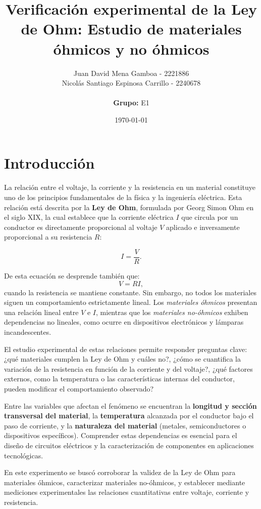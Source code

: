\documentclass[11pt,twocolumn]{article}
\title{\textbf{Verificación experimental de la Ley de Ohm: Estudio de materiales óhmicos y no óhmicos}}
\author{%
  Juan David Mena Gamboa - 2221886\\
  Nicolás Santiago Espinosa Carrillo - 2240678 \\
                      \\
  \textbf{Grupo:} E1
}
\date{\today}
\begin{document}
\maketitle
\thispagestyle{fancy}

\section{Introducción}

La relación entre el voltaje, la corriente y la resistencia en un material constituye uno de los principios fundamentales de la física y la ingeniería eléctrica. Esta relación está descrita por la \textbf{Ley de Ohm}, formulada por Georg Simon Ohm en el siglo XIX, la cual establece que la corriente eléctrica $I$ que circula por un conductor es directamente proporcional al voltaje $V$ aplicado e inversamente proporcional a su resistencia $R$:

\begin{equation}
I = \frac{V}{R}.
\end{equation}

De esta ecuación se desprende también que:
\begin{equation}
V = RI,
\end{equation}
cuando la resistencia se mantiene constante. Sin embargo, no todos los materiales siguen un comportamiento estrictamente lineal. Los \textit{materiales óhmicos} presentan una relación lineal entre $V$ e $I$, mientras que los \textit{materiales no-óhmicos} exhiben dependencias no lineales, como ocurre en dispositivos electrónicos y lámparas incandescentes.  

El estudio experimental de estas relaciones permite responder preguntas clave: ¿qué materiales cumplen la Ley de Ohm y cuáles no?, ¿cómo se cuantifica la variación de la resistencia en función de la corriente y del voltaje?, ¿qué factores externos, como la temperatura o las características internas del conductor, pueden modificar el comportamiento observado?  

Entre las variables que afectan el fenómeno se encuentran la \textbf{longitud y sección transversal del material}, la \textbf{temperatura} alcanzada por el conductor bajo el paso de corriente, y la \textbf{naturaleza del material} (metales, semiconductores o dispositivos específicos). Comprender estas dependencias es esencial para el diseño de circuitos eléctricos y la caracterización de componentes en aplicaciones tecnológicas.  

En este experimento se buscó corroborar la validez de la Ley de Ohm para materiales óhmicos, caracterizar materiales no-óhmicos, y establecer mediante mediciones experimentales las relaciones cuantitativas entre voltaje, corriente y resistencia.
\end{document}
